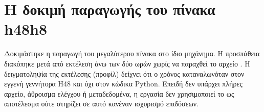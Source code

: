 \begin{table}[htbp]\centering

\caption[Επιστροφή του superflip από την κρυφή μνήμη πιστοποιητικών]{Επιστροφή του superflip από την κρυφή μνήμη πιστοποιητικών του χαρτοφυλακίου σε 0.012885~s, μετά την επανεπικύρωση του αποθηκευμένου ακριβούς πιστοποιητικού. Πηγή: τεκμήριο  του .}
\label{tab:portfolio-superflip-cache}
\end{table}

\section{Η δοκιμή παραγωγής του πίνακα h48h8}
\label{sec:h48eng-h48h8}

Δοκιμάστηκε η παραγωγή του μεγαλύτερου πίνακα  στο ίδιο μηχάνημα. Η προσπάθεια διακόπηκε μετά από εκτέλεση άνω των δύο ωρών χωρίς να παραχθεί το αρχείο . Η δειγματοληψία της εκτέλεσης (προφίλ) δείχνει ότι ο χρόνος καταναλωνόταν στον εγγενή γεννήτορα H48 και όχι στον κώδικα Python. Επειδή δεν υπάρχει πλήρες αρχείο, άθροισμα ελέγχου ή μεταδεδομένα, η εργασία δεν χρησιμοποιεί το  ως αποτέλεσμα ούτε στηρίζει σε αυτό κανέναν ισχυρισμό επιδόσεων.
